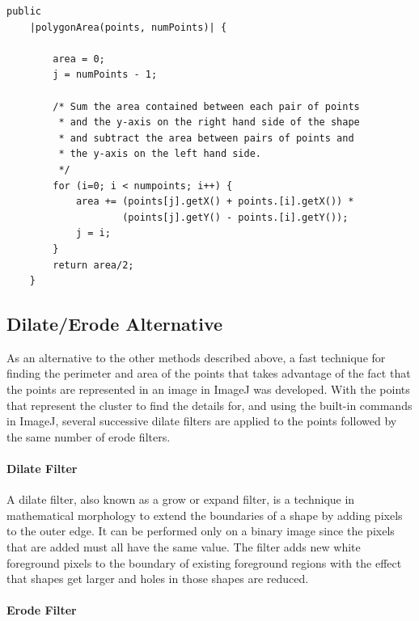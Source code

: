 \begin{center}
\begin{minipage}{\textwidth}
	\begin{lstlisting}[caption={[Code to find the area of an irregular
	polygon.]Code to find the area of an irregular polygon.  Adapted
	from~\cite{finley2006poly}}, label=lst:polygon-area] public
	|polygonArea(points, numPoints)| {

		area = 0;
		j = numPoints - 1;

		/* Sum the area contained between each pair of points
		 * and the y-axis on the right hand side of the shape
		 * and subtract the area between pairs of points and
		 * the y-axis on the left hand side.
		 */
		for (i=0; i < numpoints; i++) {
			area += (points[j].getX() + points.[i].getX()) *
		        	(points[j].getY() - points.[i].getY());
			j = i;
		}
		return area/2;
	}
\end{lstlisting}
\end{minipage}
\end{center}

\subsection{Dilate/Erode Alternative}
\label{ssub:Dilate/Erode Alternative}

As an alternative to the other methods described above, a fast technique for
finding the perimeter and area of the points that takes advantage of the fact
that the points are represented in an image in ImageJ was developed. With the
points that represent the cluster to find the details for, and using the
built-in commands in ImageJ, several successive dilate filters are applied to
the points followed by the same number of erode filters.

\paragraph{Dilate Filter}
\label{par:dilate_filter}

A dilate filter, also known as a grow or expand filter, is a technique in
mathematical morphology to extend the boundaries of a shape by adding pixels to
the outer edge. It can be performed only on a binary image since the pixels
that are added must all have the same value. The filter adds new white
foreground pixels to the boundary of existing foreground regions with the
effect that shapes get larger and holes in those shapes are reduced.

\paragraph{Erode Filter}
\label{par:erode_filter}

